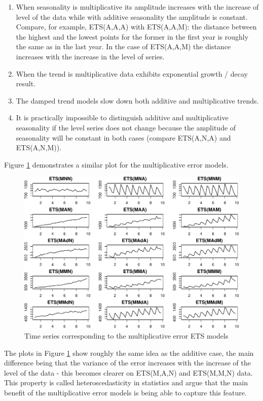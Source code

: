 \documentclass[
]{book}
\providecommand{\tightlist}{%
  \setlength{\itemsep}{0pt}\setlength{\parskip}{0pt}}
\theoremstyle{definition}
\theoremstyle{definition}
\theoremstyle{definition}
\theoremstyle{definition}
\theoremstyle{remark}
\begin{document}
\begin{enumerate}
\def\labelenumi{\arabic{enumi}.}
\tightlist
\item
  When seasonality is multiplicative its amplitude increases with the increase of level of the data while with additive seasonality the amplitude is constant. Compare, for example, ETS(A,A,A) with ETS(A,A,M): the distance between the highest and the lowest points for the former in the first year is roughly the same as in the last year. In the case of ETS(A,A,M) the distance increases with the increase in the level of series.
\item
  When the trend is multiplicative data exhibits exponential growth / decay result.
\item
  The damped trend models slow down both additive and multiplicative trends.
\item
  It is practically impossible to distinguish additive and multiplicative seasonality if the level series does not change because the amplitude of seasonality will be constant in both cases (compare ETS(A,N,A) and ETS(A,N,M)).
\end{enumerate}

Figure \ref{fig:ETSTaxonomyMultiplicative} demonstrates a similar plot for the multiplicative error models.

\begin{figure}
\centering
\includegraphics{adam_files/figure-latex/ETSTaxonomyMultiplicative-1.pdf}
\caption{\label{fig:ETSTaxonomyMultiplicative}Time series corresponding to the multiplicative error ETS models}
\end{figure}

The plots in Figure \ref{fig:ETSTaxonomyMultiplicative} show roughly the same idea as the additive case, the main difference being that the variance of the error increases with the increase of the level of the data - this becomes clearer on ETS(M,A,N) and ETS(M,M,N) data. This property is called heteroscedasticity in statistics and \citet{Hyndman2008b} argue that the main benefit of the multiplicative error models is being able to capture this feature.
\end{document}
